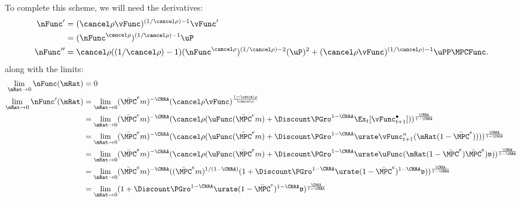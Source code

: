 \documentclass{\handout}
\begin{document}
\begin{CDCPrivate}
To complete this scheme, we will need the derivatives:
\begin{equation}\begin{gathered}\begin{aligned}
    \nFuncP  & =  (\crho \vFunc)^{(1/\crho)-1} \vFunc^{\prime}
\\           & =  (\nFunc^{\crho})^{(1/\crho)-1} \uP
\\  \nFuncPP & =  \crho ((1/\crho)-1)(\nFunc^{\crho})^{(1/\crho)-2} (\uP)^2 + (\crho\vFunc)^{(1/\crho)-1} \uPP \MPCFunc
.
\end{aligned}\end{gathered}\end{equation}
along with the limits:
\begin{equation}\begin{gathered}\begin{aligned}
   \lim_{\mRat \rightarrow 0} \nFunc(\mRat) & =  0
\\ \lim_{\mRat \rightarrow 0} \nFuncP(\mRat) & =  \lim_{\mRat \rightarrow 0} (\bar{\MPC}^{e} m)^{-\CRRA} (\crho \vFunc)^{\frac{1-\crho}{\crho}} 
\\ & =  \lim_{\mRat \rightarrow 0} (\bar{\MPC}^{e} m)^{-\CRRA} (\crho(\uFunc(\bar{\MPC}^{e} m) + \Discount \PGro^{1-\CRRA} \Ex_{t}[\vFunc^{\bullet}_{t+1}]))^{\frac{\CRRA}{1-\CRRA}} 
\\ & =  \lim_{\mRat \rightarrow 0} (\bar{\MPC}^{e} m)^{-\CRRA} (\crho(\uFunc(\bar{\MPC}^{e} m) + \Discount \PGro^{1-\CRRA} \urate \vFunc^{u}_{t+1}(\mRat(1-\bar{\MPC}^{e}))))^{\frac{\CRRA}{1-\CRRA}} 
\\ & =  \lim_{\mRat \rightarrow 0} (\bar{\MPC}^{e} m)^{-\CRRA} (\crho(\uFunc(\bar{\MPC}^{e} m) + \Discount \PGro^{1-\CRRA} \urate \uFunc(\mRat(1-\bar{\MPC}^{e})\bar{\MPC}^{e})\mathfrak{v}))^{\frac{\CRRA}{1-\CRRA}} 
\\ & =  \lim_{\mRat \rightarrow 0} (\bar{\MPC}^{e} m)^{-\CRRA} ((\bar{\MPC}^{e} m)^{1/(1-\CRRA)}(1 + \Discount \PGro^{1-\CRRA} \urate (1-\bar{\MPC}^{e})^{1-\CRRA}\mathfrak{v}))^{\frac{\CRRA}{1-\CRRA}} 
\\ & =  \lim_{\mRat \rightarrow 0} (1 + \Discount \PGro^{1-\CRRA} \urate 
(1-\bar{\MPC}^{e})^{1-\CRRA}\mathfrak{v})^{\frac{\CRRA}{1-\CRRA}} %
\end{aligned}\end{gathered}\end{equation}


\end{CDCPrivate}
\end{document}
